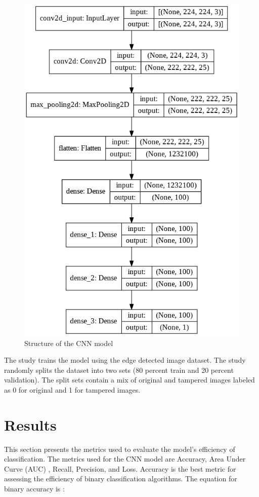 \documentclass[conference]{IEEEtran}
\begin{document}
\begin{figure}[htpb]
\centerline{\includegraphics[scale = 0.33]{model.png}}
\caption{Structure of the CNN model}
\label{model}
\end{figure}

The study trains the model using the edge detected image dataset. The study randomly splits the dataset into two sets (80 percent train and 20 percent validation). The split sets contain a mix of original and tampered images labeled as 0 for original and 1 for tampered images. 

\section{Results}
This section presents the metrics used to evaluate the model's efficiency of classification. The metrics used for the CNN model are Accuracy, Area Under Curve (AUC) \cite{b12}, Recall, Precision, and Loss. Accuracy is the best metric for assessing the efficiency of binary classification algorithms. The equation for binary accuracy is :
\end{document}
